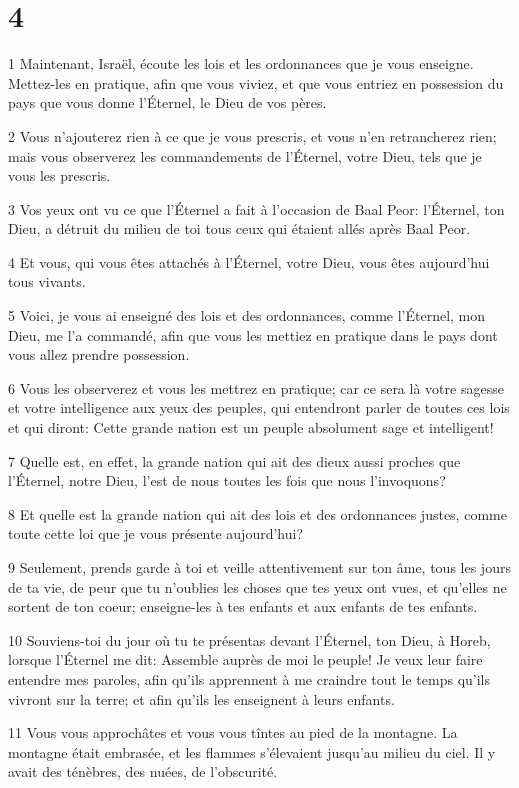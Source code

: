 \chapter{4}

\par 1 Maintenant, Israël, écoute les lois et les ordonnances que je vous enseigne. Mettez-les en pratique, afin que vous viviez, et que vous entriez en possession du pays que vous donne l'Éternel, le Dieu de vos pères.
\par 2 Vous n'ajouterez rien à ce que je vous prescris, et vous n'en retrancherez rien; mais vous observerez les commandements de l'Éternel, votre Dieu, tels que je vous les prescris.
\par 3 Vos yeux ont vu ce que l'Éternel a fait à l'occasion de Baal Peor: l'Éternel, ton Dieu, a détruit du milieu de toi tous ceux qui étaient allés après Baal Peor.
\par 4 Et vous, qui vous êtes attachés à l'Éternel, votre Dieu, vous êtes aujourd'hui tous vivants.
\par 5 Voici, je vous ai enseigné des lois et des ordonnances, comme l'Éternel, mon Dieu, me l'a commandé, afin que vous les mettiez en pratique dans le pays dont vous allez prendre possession.
\par 6 Vous les observerez et vous les mettrez en pratique; car ce sera là votre sagesse et votre intelligence aux yeux des peuples, qui entendront parler de toutes ces lois et qui diront: Cette grande nation est un peuple absolument sage et intelligent!
\par 7 Quelle est, en effet, la grande nation qui ait des dieux aussi proches que l'Éternel, notre Dieu, l'est de nous toutes les fois que nous l'invoquons?
\par 8 Et quelle est la grande nation qui ait des lois et des ordonnances justes, comme toute cette loi que je vous présente aujourd'hui?
\par 9 Seulement, prends garde à toi et veille attentivement sur ton âme, tous les jours de ta vie, de peur que tu n'oublies les choses que tes yeux ont vues, et qu'elles ne sortent de ton coeur; enseigne-les à tes enfants et aux enfants de tes enfants.
\par 10 Souviens-toi du jour où tu te présentas devant l'Éternel, ton Dieu, à Horeb, lorsque l'Éternel me dit: Assemble auprès de moi le peuple! Je veux leur faire entendre mes paroles, afin qu'ils apprennent à me craindre tout le temps qu'ils vivront sur la terre; et afin qu'ils les enseignent à leurs enfants.
\par 11 Vous vous approchâtes et vous vous tîntes au pied de la montagne. La montagne était embrasée, et les flammes s'élevaient jusqu'au milieu du ciel. Il y avait des ténèbres, des nuées, de l'obscurité.

